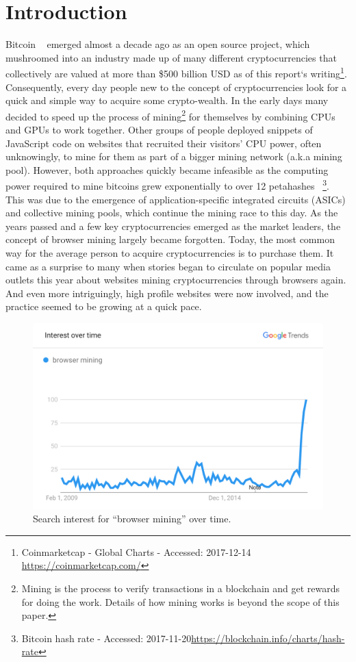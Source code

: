 
\section{Introduction}
Bitcoin ~\cite{nakamoto2008bitcoin} emerged almost a decade ago as an open source project, which mushroomed into an industry made up of many different cryptocurrencies that collectively are valued at more than \$500 billion USD as of this report`s writing\footnote{Coinmarketcap - Global Charts - Accessed: 2017-12-14 \url{https://coinmarketcap.com/}}. Consequently, every day people new to the concept of cryptocurrencies look for a quick and simple way to acquire some crypto-wealth. In the early days many decided to speed up the process of mining\footnote{Mining is the process to verify transactions in a blockchain and get rewards for doing the work. Details of how mining works is beyond the scope of this paper.} for themselves by combining CPUs and GPUs to work together. Other groups of people deployed snippets of JavaScript code on websites that recruited their visitors’ CPU power, often unknowingly, to mine for them as part of a bigger mining network (a.k.a mining pool). However, both approaches quickly became infeasible as the computing power required to mine bitcoins grew exponentially to over 12 petahashes ~\footnote{Bitcoin hash rate - Accessed: 2017-11-20\url{https://blockchain.info/charts/hash-rate}}. This was due to the emergence of application-specific integrated circuits (ASICs) and collective mining pools, which continue the mining race to this day. As the years passed and a few key cryptocurrencies emerged as the market leaders, the concept of browser mining largely became forgotten. Today, the most common way for the average person to acquire cryptocurrencies is to purchase them. It came as a surprise to many when stories began to circulate on popular media outlets this year about websites mining cryptocurrencies through browsers again. And even more intriguingly, high profile websites were now involved, and the practice seemed to be growing at a quick pace.

\begin{figure}[t]
\centering
\includegraphics[width=\linewidth]{figures/browser_mining.png}
\caption{Search interest for ``browser mining'' over time.\label{fig:interest}}
\end{figure}


